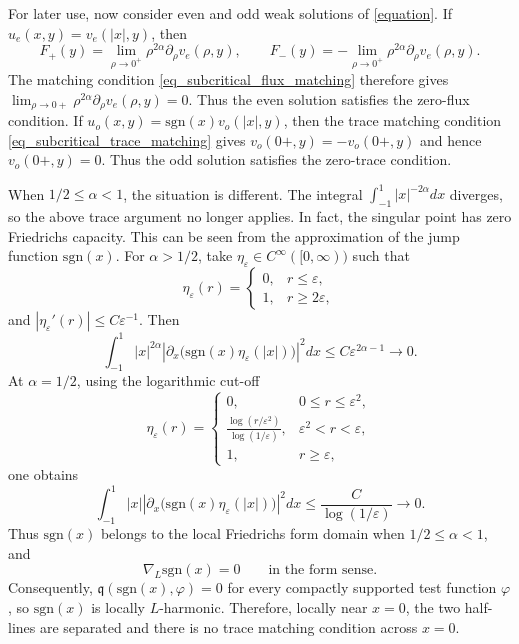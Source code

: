 \documentclass[12pt]{amsart}
\begin{document}
For later use, now consider even and odd weak solutions of \eqref{equation}. If $u_e(x,y)=v_e(|x|,y)$, then
\begin{equation*}
F_+(y)=\lim_{\rho\to0^+}\rho^{2\alpha}\partial_\rho v_e(\rho,y),
    \qquad
    F_-(y)=-\lim_{\rho\to0^+}\rho^{2\alpha}\partial_\rho v_e(\rho,y). 
\end{equation*}
The matching condition \eqref{eq_subcritical_flux_matching} therefore gives $\lim_{\rho\to0+}\rho^{2\alpha}\partial_\rho v_e(\rho,y)=0$. Thus the even solution satisfies the zero-flux condition. If $u_o(x,y)=\mathrm{sgn}(x)v_o(|x|,y)$, then the trace matching condition \eqref{eq_subcritical_trace_matching} gives $v_o(0+,y)=-v_o(0+,y)$ and hence $v_o(0+,y)=0$. Thus the odd solution satisfies the zero-trace condition.


When $1/2\leq\alpha<1$, the situation is different. The integral $\int_{-1}^{1}|x|^{-2\alpha}dx$ diverges, so the above trace argument no longer applies. In fact, the singular point has zero
Friedrichs capacity. This can be seen from the approximation of the jump function $\mathrm{sgn}(x)$.
For $\alpha>1/2$, take $\eta_\varepsilon\in C^\infty([0,\infty))$ such that
\begin{equation*}
    \eta_\varepsilon(r) = \begin{cases}
        0, & r\le \varepsilon,\\
        1, & r\ge 2\varepsilon,
    \end{cases}
\end{equation*}
and $|\eta_\varepsilon'(r)|\leq C\varepsilon^{-1}$. Then
\begin{equation*}
    \int_{-1}^{1}
    |x|^{2\alpha}
    \left|
        \partial_x\bigl(\mathrm{sgn}(x)\eta_\varepsilon(|x|)\bigr)
    \right|^2 dx
    \le
    C\varepsilon^{2\alpha-1}
    \to 0.
\end{equation*}
At $\alpha=1/2$, using the logarithmic cut-off
\begin{equation*}
\eta_\varepsilon(r)= \begin{cases}
        0, & 0\le r\leq\varepsilon^2,\\
        \frac{\log(r/\varepsilon^2)}{\log(1/\varepsilon)},
        & \varepsilon^2<r<\varepsilon,\\
        1, & r\ge \varepsilon,
    \end{cases}
\end{equation*}
one obtains
\begin{equation*}
\int_{-1}^{1}|x|\left|\partial_x\bigl(\mathrm{sgn}(x)\eta_\varepsilon(|x|)\bigr)\right|^2 dx \le \frac{C}{\log(1/\varepsilon)} \to 0.
\end{equation*}
Thus $\mathrm{sgn}(x)$ belongs to the local Friedrichs form domain when
$1/2\leq\alpha<1$, and
\begin{equation}\label{eq:gradient:sgn}
    \nabla_L \mathrm{sgn}(x)=0
    \qquad
    \text{in the form sense}.
\end{equation}
Consequently, $\mathfrak q(\mathrm{sgn}(x),\varphi)=0$ for every compactly supported test function $\varphi$, so $\mathrm{sgn}(x)$ is
locally $L$-harmonic. Therefore, locally near $x=0$, the two half-lines are separated and there is no trace matching condition across $x=0$. 
\end{document}
